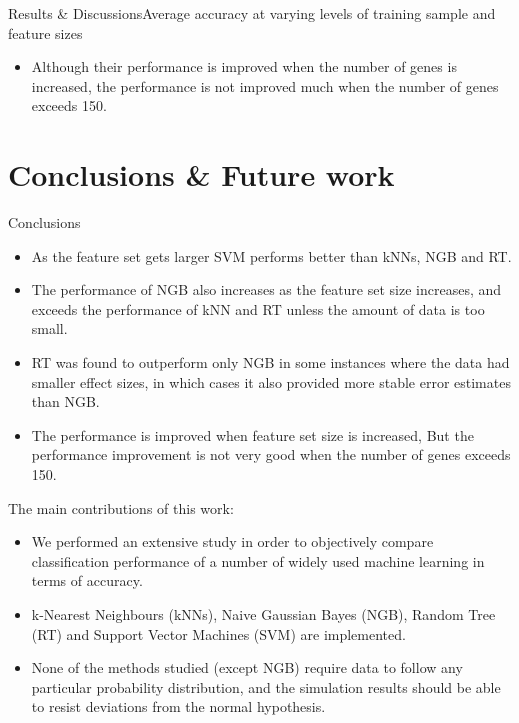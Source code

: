 \documentclass[xcolor=table]{beamer}
\numberwithin{figure}{section}
\numberwithin{equation}{section}
\begin{document}
\begin{frame}{Results \& Discussions}{Average accuracy at varying levels of training sample and feature sizes}
\begin{figure}
\begin{subfigure}
\end{subfigure}
\end{figure}    
\begin{itemize}
    \item \footnotesize{Although their performance is improved when the number of genes is increased, the performance is not improved much when the number of genes exceeds 150.}
\end{itemize}
\end{frame}
\section{Conclusions \& Future work}
\begin{frame}[allowframebreaks]{Conclusions}
  \begin{itemize}
    \item As the feature set gets larger SVM performs better than kNNs, NGB and RT.
    \item The performance of NGB also increases as the feature set size increases, and exceeds the performance of kNN and RT unless the amount of data is too small.
    \item RT was found to outperform only NGB in some instances where the data had smaller effect sizes, in which cases it also provided more stable error estimates than NGB.
    \item The performance is improved when feature set size is increased, But the performance improvement is not very good when the number of genes exceeds 150.
  \end{itemize}
\framebreak
  The main contributions of this work:
\begin{itemize}
    \item We performed an extensive study in order to objectively compare classification performance of a number of widely used machine learning in terms of accuracy.
    \item k-Nearest Neighbours (kNNs), Naive Gaussian Bayes (NGB), Random Tree (RT) and Support Vector Machines (SVM) are implemented.
  \item None of the methods studied (except NGB) require data to follow any particular probability distribution, and the simulation results should be able to resist deviations from the normal hypothesis.
\end{itemize}
\framebreak
  \begin{itemize}

\end{itemize}
\end{frame}
\end{document}
